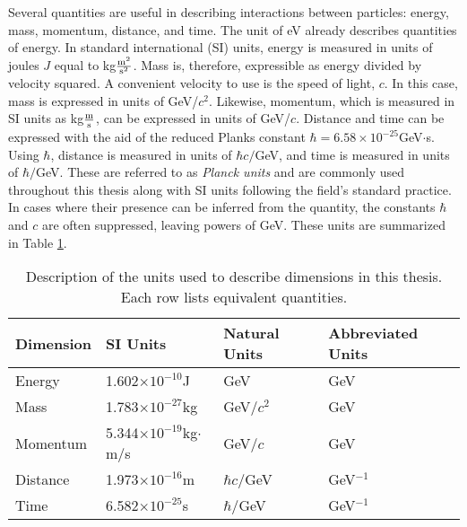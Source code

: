 Several quantities are useful in describing interactions between particles: energy, mass, momentum, distance, and time.
The unit of eV already describes quantities of energy.
In standard international (SI) units, energy is measured in units of joules $J$ equal to kg$\frac{\text m^2}{\text s^2}$. Mass is, therefore, expressible as energy divided by velocity squared.
A convenient velocity to use is the speed of light, $c$.
In this case, mass is expressed in units of GeV/$c^2$.
Likewise, momentum, which is measured in SI units as kg$\frac{\text m}{\text s}$, can be expressed in units of GeV/$c$.
Distance and time can be expressed with the aid of the reduced Planks constant $\hbar=6.58\times10^{-25}$GeV$\cdot$s.
Using $\hbar$, distance is measured in units of $\hbar c/$GeV, and time is measured in units of $\hbar/$GeV.
These are referred to as \emph{Planck units} and are commonly used throughout this thesis along with SI units following the field's standard practice.
In cases where their presence can be inferred from the quantity, the constants $\hbar$ and $c$ are often suppressed, leaving powers of GeV.
These units are summarized in Table \ref{tab:units}.

\begin{table}[htp]
\begin{center}
\begin{tabular}{l l l l}
\toprule
Dimension & SI Units & Natural Units & Abbreviated Units \\
\midrule
Energy    &    1.602$\times10^{-10}$J               & GeV            & GeV \\
Mass      &    1.783$\times10^{-27}$kg              & GeV/$c^2$      & GeV \\
Momentum  &    5.344$\times10^{-19}$kg$\cdot$m/s    & GeV/$c$        & GeV \\
Distance  &    1.973$\times10^{-16}$m               & $\hbar c/$GeV  & GeV$^{-1}$ \\
Time      &    6.582$\times10^{-25}$s               & $\hbar/$GeV    & GeV$^{-1}$ \\
\bottomrule
\end{tabular}
\caption{Description of the units used to describe dimensions in this thesis. Each row lists equivalent quantities.}
\label{tab:units}
\end{center}
\end{table}


